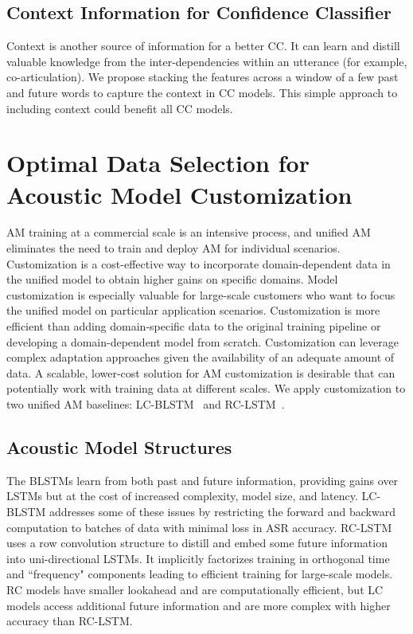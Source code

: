 \documentclass[a4paper]{article}
\begin{document}
\subsection{Context Information for Confidence Classifier}
Context is another source of information for a better CC. It can learn and distill valuable knowledge from the inter-dependencies within an utterance (for example, co-articulation). We propose stacking the features across a window of a few past and future words to capture the context in  CC models. This simple approach to including context could benefit all CC models.
\section{Optimal Data Selection for Acoustic Model Customization }
\label{sec:am}
AM training at a commercial scale is an intensive process, and unified AM eliminates the need to train and deploy AM for individual scenarios. Customization is a cost-effective way to incorporate domain-dependent data in the unified model to obtain higher gains on specific domains. Model customization is especially valuable for large-scale customers who want to focus the unified model on particular application scenarios. Customization is more efficient than adding domain-specific data to the original training pipeline or developing a domain-dependent model from scratch. Customization can leverage complex adaptation approaches given the availability of an adequate amount of data. A scalable, lower-cost solution for AM customization is desirable that can potentially work with training data at different scales. We apply customization to two unified AM baselines: LC-BLSTM~\cite{Xue2017,Chen2016} and RC-LSTM~\cite{Kumar2020}. 
\subsection{Acoustic Model Structures}
The BLSTMs learn from both past and future information, providing gains over LSTMs but at the cost of increased complexity, model size, and latency. LC-BLSTM addresses some of these issues by restricting the forward and backward computation to batches of data with minimal loss in ASR accuracy. RC-LSTM uses a row convolution structure to distill and embed some future information into uni-directional LSTMs. It implicitly factorizes training in orthogonal time and ``frequency" components leading to efficient training for large-scale models. RC models have smaller lookahead and are computationally efficient, but LC models access additional future information and are more complex with higher accuracy than RC-LSTM.
\end{document}
